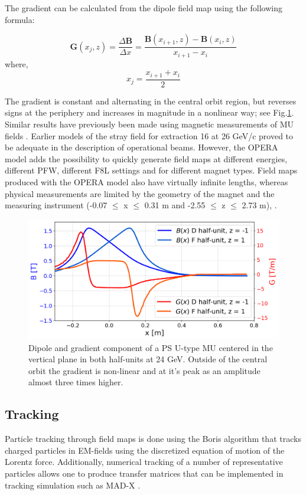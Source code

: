 \documentclass[a4paper,
               biblatex,     %
               keeplastbox,   %
               ]{jacow}
\begin{document}
The gradient can be calculated from the dipole field map using the following formula:
 
$$ \boldsymbol{G}(x_{j},z) = \frac{\Delta\boldsymbol{B}}{\Delta x} = \frac{\boldsymbol{B}(x_{i+1},z) - \boldsymbol{B}(x_{i},z)}{x_{i+1}-x_{i}} $$
where,
$$ x_{j} = \frac{x_{i+1} + x_{i}}{{2}} $$
 
The gradient is constant and alternating in the central orbit region, but reverses signs at the periphery and increases in magnitude in a nonlinear way; see Fig.\ref{fig:gradient_field}. Similar results have previously been made using magnetic measurements of MU fields \cite{manglunki_beam_1997}. Earlier models of the stray field for extraction 16 at 26 GeV/c proved to be adequate in the description of operational beams. However, the OPERA model adds the possibility to quickly generate field maps at different energies, different PFW, different F8L settings and for different magnet types. Field maps produced with the OPERA model also have virtually infinite lengths, whereas physical measurements are limited by the geometry of the magnet and the measuring instrument (-0.07 $\leq$ x $\leq$ 0.31 m and -2.55 $\leq$ z $\leq$ 2.73 m), \cite{manglunki_beam_1997}.

\begin{figure}[!htb]
   \centering
   \includegraphics*[width=1.0\columnwidth, trim={0 0 0 0cm},clip]{MOPOTK030_f4.png}
   \caption{Dipole and gradient component of a  PS U-type MU centered in the vertical plane in both half-units at 24 GeV. Outside of the central orbit the gradient is non-linear and at it's peak as an amplitude almost three times higher.}
   \label{fig:gradient_field}
\end{figure}

\subsection{Tracking}
Particle tracking through field maps is done using the Boris algorithm that tracks charged particles in EM-fields using the discretized equation of motion of the Lorentz force\cite{qin_why_2013}\cite{ripperda_comprehensive_2018}. Additionally, numerical tracking of a number of representative particles allows one to produce transfer matrices that can be implemented in tracking simulation such as MAD-X \cite{yoon_method_2013}.
\end{document}
